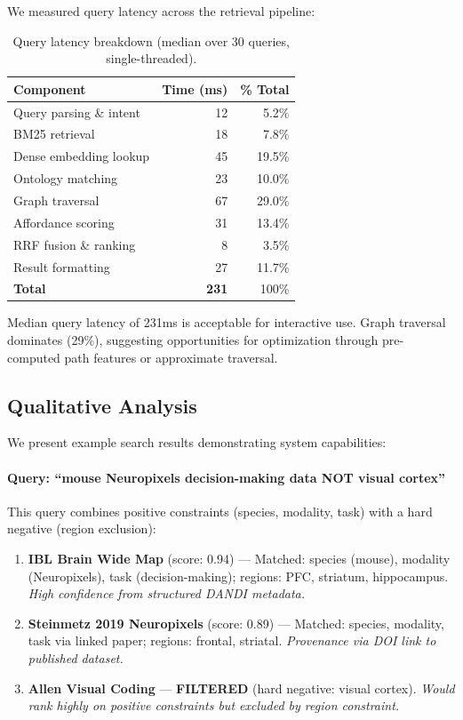 \documentclass{article}
\theoremstyle{definition}
\begin{document}
We measured query latency across the retrieval pipeline:

\begin{table}[t]
\centering
\small
\caption{Query latency breakdown (median over 30 queries, single-threaded).}
\label{tab:latency}
\begin{tabular}{lrr}
\toprule
\textbf{Component} & \textbf{Time (ms)} & \textbf{\% Total} \\
\midrule
Query parsing \& intent & 12 & 5.2\% \\
BM25 retrieval & 18 & 7.8\% \\
Dense embedding lookup & 45 & 19.5\% \\
Ontology matching & 23 & 10.0\% \\
Graph traversal & 67 & 29.0\% \\
Affordance scoring & 31 & 13.4\% \\
RRF fusion \& ranking & 8 & 3.5\% \\
Result formatting & 27 & 11.7\% \\
\midrule
\textbf{Total} & \textbf{231} & 100\% \\
\bottomrule
\end{tabular}
\end{table}

Median query latency of 231ms is acceptable for interactive use. Graph traversal dominates (29\%), suggesting opportunities for optimization through pre-computed path features or approximate traversal.

\subsection{Qualitative Analysis}

We present example search results demonstrating system capabilities:

\paragraph{Query: ``mouse Neuropixels decision-making data NOT visual cortex''}

This query combines positive constraints (species, modality, task) with a hard negative (region exclusion):

\begin{enumerate}
    \item \textbf{IBL Brain Wide Map} (score: 0.94) --- Matched: species (mouse), modality (Neuropixels), task (decision-making); regions: PFC, striatum, hippocampus. \textit{High confidence from structured DANDI metadata.}

    \item \textbf{Steinmetz 2019 Neuropixels} (score: 0.89) --- Matched: species, modality, task via linked paper; regions: frontal, striatal. \textit{Provenance via DOI link to published dataset.}

    \item \textbf{Allen Visual Coding} --- \textbf{FILTERED} (hard negative: visual cortex). \textit{Would rank highly on positive constraints but excluded by region constraint.}
\end{enumerate}
\end{document}

